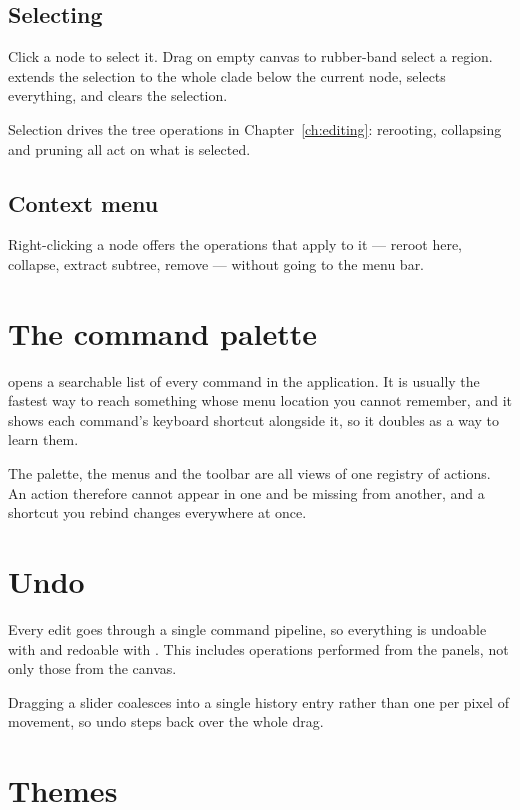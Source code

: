 \subsection{Selecting}

Click a node to select it. Drag on empty canvas to rubber-band select a region.
 extends the selection to the whole clade below the current
node,  selects everything, and  clears the selection.

Selection drives the tree operations in Chapter~\ref{ch:editing}: rerooting,
collapsing and pruning all act on what is selected.

\subsection{Context menu}

Right-clicking a node offers the operations that apply to it --- reroot here,
collapse, extract subtree, remove --- without going to the menu bar.

\section{The command palette}

 opens a searchable list of every command in the application. It is
usually the fastest way to reach something whose menu location you cannot
remember, and it shows each command's keyboard shortcut alongside it, so it
doubles as a way to learn them.

The palette, the menus and the toolbar are all views of one registry of actions.
An action therefore cannot appear in one and be missing from another, and a
shortcut you rebind changes everywhere at once.

\section{Undo}

Every edit goes through a single command pipeline, so everything is undoable with
 and redoable with . This includes operations
performed from the panels, not only those from the canvas.

Dragging a slider coalesces into a single history entry rather than one per pixel
of movement, so undo steps back over the whole drag.

\section{Themes}

